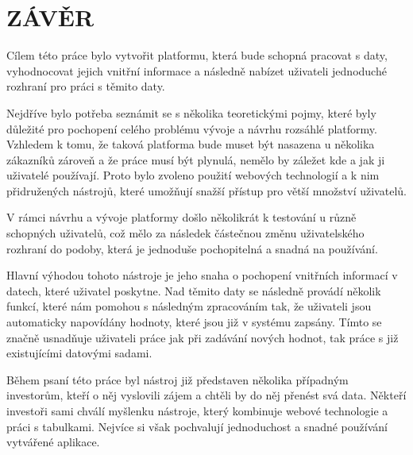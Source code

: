 \chapter*{ZÁVĚR}
\par Cílem této práce bylo vytvořit platformu, která bude schopná pracovat s daty, vyhodnocovat jejich vnitřní informace a následně nabízet uživateli jednoduché rozhraní pro práci s těmito daty.

\par Nejdříve bylo potřeba seznámit se s několika teoretickými pojmy, které byly důležité pro pochopení celého problému vývoje a návrhu rozsáhlé platformy. Vzhledem k tomu, že taková platforma bude muset být nasazena u několika zákazníků zároveň a že práce musí být plynulá, nemělo by záležet kde a jak ji uživatelé používají. Proto bylo zvoleno použití webových technologií a k nim přidružených nástrojů, které umožňují snažší přístup pro větší množství uživatelů.

\par V rámci návrhu a vývoje platformy došlo několikrát k testování u různě schopných uživatelů, což mělo za následek částečnou změnu uživatelského rozhraní do podoby, která je  jednoduše pochopitelná a snadná na používání.

\par Hlavní výhodou tohoto nástroje je jeho snaha o pochopení vnitřních informací v datech, které uživatel poskytne. Nad těmito daty se následně provádí několik funkcí, které nám pomohou s následným zpracováním tak, že uživateli jsou automaticky napovídány hodnoty, které jsou již v systému zapsány. Tímto se značně usnadňuje uživateli práce jak při zadávání nových hodnot, tak práce s již existujícími datovými sadami.

\par Během psaní této práce byl nástroj již představen několika případným investorům, kteří o něj vyslovili zájem a chtěli by do něj přenést svá data. Někteří investoři sami chválí myšlenku nástroje, který kombinuje webové technologie a práci s tabulkami. Nejvíce si však pochvalují jednoduchost a snadné používání vytvářené aplikace.